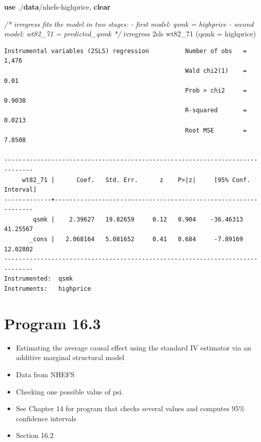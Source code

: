 \documentclass[
  10pt,
]{book}
\newenvironment{Shaded}{\begin{snugshade}}{\end{snugshade}}
\newcommand{\CommentTok}[1]{\textcolor[rgb]{0.56,0.35,0.01}{\textit{#1}}}
\newcommand{\KeywordTok}[1]{\textcolor[rgb]{0.13,0.29,0.53}{\textbf{#1}}}
\newcommand{\NormalTok}[1]{#1}
\providecommand{\tightlist}{%
  \setlength{\itemsep}{0pt}\setlength{\parskip}{0pt}}
\begin{document}
\begin{Shaded}
\begin{Highlighting}[]
\KeywordTok{use}\NormalTok{ ./}\KeywordTok{data}\NormalTok{/nhefs{-}highprice, }\KeywordTok{clear}

\CommentTok{/* ivregress fits the model in two stages:}
\CommentTok{{-} first model: qsmk = highprice}
\CommentTok{{-} second model: wt82\_71 = predicted\_qsmk */}
\NormalTok{ivregress 2sls wt82\_71 (qsmk = highprice)}
\end{Highlighting}
\end{Shaded}

\begin{verbatim}
Instrumental variables (2SLS) regression          Number of obs   =      1,476
                                                  Wald chi2(1)    =       0.01
                                                  Prob > chi2     =     0.9038
                                                  R-squared       =     0.0213
                                                  Root MSE        =     7.8508

------------------------------------------------------------------------------
     wt82_71 |      Coef.   Std. Err.      z    P>|z|     [95% Conf. Interval]
-------------+----------------------------------------------------------------
        qsmk |    2.39627   19.82659     0.12   0.904    -36.46313    41.25567
       _cons |   2.068164   5.081652     0.41   0.684     -7.89169    12.02802
------------------------------------------------------------------------------
Instrumented:  qsmk
Instruments:   highprice
\end{verbatim}

\hypertarget{program-16.3-1}{%
\section{Program 16.3}\label{program-16.3-1}}

\begin{itemize}
\tightlist
\item
  Estimating the average causal effect using the standard IV estimator via an additive marginal structural model
\item
  Data from NHEFS
\item
  Checking one possible value of psi.
\item
  See Chapter 14 for program that checks several values and computes 95\% confidence intervals\\
\item
  Section 16.2
\end{itemize}
\end{document}
